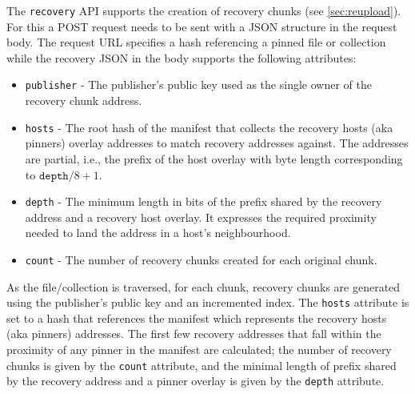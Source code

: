 
The \texttt{recovery} API supports the creation of recovery chunks (see \ref{sec:reupload}). For this a POST request needs to be sent with a JSON structure in the request body. The request URL specifies a hash referencing a pinned file or collection while the recovery JSON in the body supports the following attributes:

\begin{itemize}
\item \texttt{publisher} - The publisher's public key used as the single  owner of the recovery chunk address.
\item \texttt{hosts} - The root hash of the manifest that collects the recovery hosts (aka pinners) overlay addresses to match recovery addresses against. The addresses are partial, i.e., the prefix of the host overlay with byte length corresponding to $\mathtt{depth} / 8+1$.  
\item \texttt{depth} - The minimum length in bits of the prefix shared by the recovery address and a recovery host overlay. It expresses the required proximity needed to land the address in a host's neighbourhood. 
\item \texttt{count} - The number of recovery chunks created for each original chunk. 
\end{itemize}

As the file/collection is traversed, for each chunk, recovery chunks are generated using the publisher's public key and an incremented index. The \texttt{hosts} attribute is set to a hash that references the manifest which represents the recovery hosts (aka pinners) addresses. The first few recovery addresses that fall within the proximity of any pinner in the manifest are calculated; the number of recovery chunks is given by the \texttt{count} attribute, and the minimal length of prefix shared by the recovery address and a pinner overlay is given by the \texttt{depth} attribute.